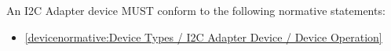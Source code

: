 \label{sec:Conformance / Device Conformance / I2C Adapter Device Conformance}

An I2C Adapter device MUST conform to the following normative statements:

\begin{itemize}
\item \ref{devicenormative:Device Types / I2C Adapter Device / Device Operation}
\end{itemize}
